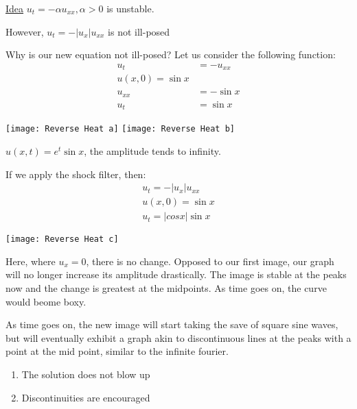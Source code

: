 \documentclass{article}
\begin{document}
\underline{Idea} $u_t = -\alpha u_{xx}, \alpha > 0$ is unstable.

However, $u_t = -|u_x| u_{xx}$ is not ill-posed

Why is our new equation not ill-posed? Let us consider the following function:
%
\begin{align*}
  u_t & = -u_{xx}\\
  u(x, 0) = \sin x\\
  u_{xx} & = -\sin x\\
  u_t & = \sin x
\end{align*}

\begin{center}
  \texttt{[image: Reverse Heat a]}
  \texttt{[image: Reverse Heat b]}
\end{center}

$u(x, t) = e^t \sin x$, the amplitude tends to infinity.

If we apply the shock filter, then:
%
\begin{align*}
  u_t = -|u_x| u_{xx}\\
  u(x, 0) = \sin x\\
  u_t = |cos x| \sin x
\end{align*}

\begin{center}
  \texttt{[image: Reverse Heat c]}
\end{center}

Here, where $u_x = 0$, there is no change. Opposed to our first image, our graph will no longer increase its amplitude drastically. The image is stable at the peaks now and the change is greatest at the midpoints. As time goes on, the curve would beome boxy.

As time goes on, the new image will start taking the save of square sine waves, but will eventually exhibit a graph akin to discontinuous lines at the peaks with a point at the mid point, similar to the infinite fourier.

\note
\begin{enumerate}
  \item The solution does not blow up
  \item Discontinuities are encouraged
\end{enumerate}
\end{document}
